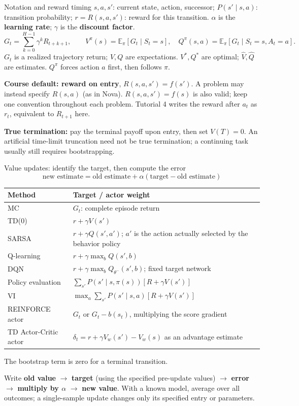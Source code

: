\documentclass[10pt,a4paper]{article}
\newcommand{\E}{\mathbb E}
\begin{document}
\begin{card}{Notation and reward timing}
$s,a,s'$: current state, action, successor; $P(s'\mid s,a)$: transition probability; $r=R(s,a,s')$: reward for this transition. $\alpha$ is the \textbf{learning rate}; $\gamma$ is the \textbf{discount factor}.
\[
G_t=\sum_{k=0}^{H-1}\gamma^kR_{t+k+1},\qquad
V^\pi(s)=\E_\pi[G_t\mid S_t=s],\quad
Q^\pi(s,a)=\E_\pi[G_t\mid S_t=s,A_t=a].
\]
$G_t$ is a realized trajectory return; $V,Q$ are expectations. $V^*,Q^*$ are optimal; $\hat V,\hat Q$ are estimates. $Q^\pi$ forces action $a$ first, then follows $\pi$.

\textbf{Course default: reward on entry}, $R(s,a,s')=f(s')$. A problem may instead specify $R(s,a)$ (as in Nova). $R(s,a,s')=f(s)$ is also valid; keep one convention throughout each problem. Tutorial 4 writes the reward after $a_t$ as $r_t$, equivalent to $R_{t+1}$ here.

\textbf{True termination:} pay the terminal payoff upon entry, then set $V(T)=0$. An artificial time-limit truncation need not be true termination; a continuing task usually still requires bootstrapping.
\end{card}
\begin{card}{Value updates: identify the target, then compute the error}
\[
\boxed{\text{new estimate}=\text{old estimate}+\alpha(\text{target}-\text{old estimate})}
\]
\small
\par\smallskip
\begin{tabularx}{\linewidth}{@{}P{3cm}Y@{}}
\toprule Method & Target / actor weight \\\midrule
MC & $G_t$: complete episode return \\
TD(0) & $r+\gamma V(s')$ \\
SARSA & $r+\gamma Q(s',a')$; $a'$ is the action actually selected by the behavior policy \\
Q-learning & $r+\gamma\max_bQ(s',b)$ \\
DQN & $r+\gamma\max_bQ_{\theta^-}(s',b)$; fixed target network \\
Policy evaluation & $\sum_{s'}P(s'\mid s,\pi(s))[R+\gamma V(s')]$ \\
VI & $\max_a\sum_{s'}P(s'\mid s,a)[R+\gamma V(s')]$ \\
REINFORCE actor & $G_t$ or $G_t-b(s_t)$, multiplying the score gradient \\
TD Actor-Critic actor & $\delta_t=r+\gamma V_w(s')-V_w(s)$ as an advantage estimate \\\bottomrule
\end{tabularx}\par\smallskip
The bootstrap term is zero for a terminal transition.
\end{card}
\begin{note}
Write \textbf{old value} $\to$ \textbf{target} (using the specified pre-update values) $\to$ \textbf{error} $\to$ \textbf{multiply by $\alpha$} $\to$ \textbf{new value}. With a known model, average over all outcomes; a single-sample update changes only its specified entry or parameters.
\end{note}
\end{document}
